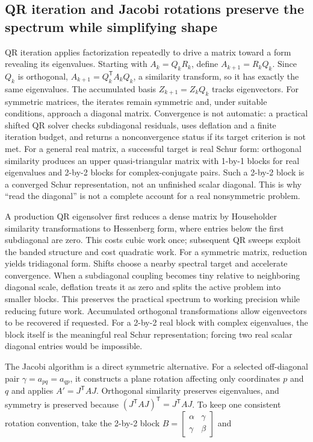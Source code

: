 \subsection{QR iteration and Jacobi rotations preserve the spectrum while simplifying shape}\label{01-foundations-i-ch020-qr-iteration-and-jacobi-rotations-preserve-the-spectrum-while-simplifying-shape}

QR iteration applies factorization repeatedly to drive a matrix toward a form revealing its eigenvalues. Starting with \(A_k=Q_kR_k\), define \(A_{k+1}=R_kQ_k\). Since \(Q_k\) is orthogonal, \(A_{k+1}=Q_k^\mathsf TA_kQ_k\), a similarity transform, so it has exactly the same eigenvalues. The accumulated basis \(Z_{k+1}=Z_kQ_k\) tracks eigenvectors. For symmetric matrices, the iterates remain symmetric and, under suitable conditions, approach a diagonal matrix. Convergence is not automatic: a practical shifted QR solver checks subdiagonal residuals, uses deflation and a finite iteration budget, and returns a nonconvergence status if its target criterion is not met. For a general real matrix, a successful target is real Schur form: orthogonal similarity produces an upper quasi-triangular matrix with 1-by-1 blocks for real eigenvalues and 2-by-2 blocks for complex-conjugate pairs. Such a 2-by-2 block is a converged Schur representation, not an unfinished scalar diagonal. This is why ``read the diagonal'' is not a complete account for a real nonsymmetric problem.

A production QR eigensolver first reduces a dense matrix by Householder similarity transformations to Hessenberg form, where entries below the first subdiagonal are zero. This costs cubic work once; subsequent QR sweeps exploit the banded structure and cost quadratic work. For a symmetric matrix, reduction yields tridiagonal form. Shifts choose a nearby spectral target and accelerate convergence. When a subdiagonal coupling becomes tiny relative to neighboring diagonal scale, deflation treats it as zero and splits the active problem into smaller blocks. This preserves the practical spectrum to working precision while reducing future work. Accumulated orthogonal transformations allow eigenvectors to be recovered if requested. For a 2-by-2 real block with complex eigenvalues, the block itself is the meaningful real Schur representation; forcing two real scalar diagonal entries would be impossible.

The Jacobi algorithm is a direct symmetric alternative. For a selected off-diagonal pair \(\gamma=a_{pq}=a_{qp}\), it constructs a plane rotation affecting only coordinates \(p\) and \(q\) and applies \(A'=J^\mathsf TAJ\). Orthogonal similarity preserves eigenvalues, and symmetry is preserved because \((J^\mathsf TAJ)^\mathsf T=J^\mathsf TAJ\). To keep one consistent rotation convention, take the 2-by-2 block \(B=\begin{bmatrix}\alpha&\gamma\\\gamma&\beta\end{bmatrix}\) and

